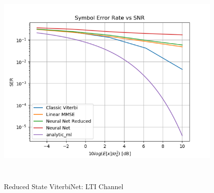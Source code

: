 \documentclass[12pt,a4paper]{report}
\begin{document}
\begin{figure}[H]
	  \caption{Reduced State ViterbiNet: LTI Channel}
	\includegraphics[width=\textwidth,height = 10cm]{results/lti_reduced}
	  \label{fig:reduced_lti}
\end{figure}
\end{document}
